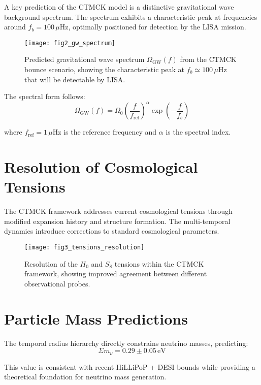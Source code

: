 \documentclass[reprint,amsmath,amssymb,aps,prd,nofootinbib,longbibliography]{revtex4-2}
\begin{document}
A key prediction of the CTMCK model is a distinctive gravitational wave background spectrum. The spectrum exhibits a characteristic peak at frequencies around $f_b = 100\,\mu$Hz, optimally positioned for detection by the LISA mission.

\begin{figure}[htb]
\centering
\texttt{[image: fig2\_gw\_spectrum]}
\caption{Predicted gravitational wave spectrum $\Omega_{\mathrm{GW}}(f)$ from the CTMCK bounce scenario, showing the characteristic peak at $f_b \simeq 100\,\mu$Hz that will be detectable by LISA.}
\label{fig:gw_spectrum}
\end{figure}

The spectral form follows:
\begin{equation}
\Omega_{\mathrm{GW}}(f) = \Omega_0 \left(\frac{f}{f_{\text{ref}}}\right)^{\alpha} \exp\left(-\frac{f}{f_b}\right)
\end{equation}

where $f_{\text{ref}} = 1\,\mu$Hz is the reference frequency and $\alpha$ is the spectral index.

\section{Resolution of Cosmological Tensions}

The CTMCK framework addresses current cosmological tensions through modified expansion history and structure formation. The multi-temporal dynamics introduce corrections to standard cosmological parameters.

\begin{figure}[htb]
\centering
\texttt{[image: fig3\_tensions\_resolution]}
\caption{Resolution of the $H_0$ and $S_8$ tensions within the CTMCK framework, showing improved agreement between different observational probes.}
\label{fig:tensions}
\end{figure}

\section{Particle Mass Predictions}

The temporal radius hierarchy directly constrains neutrino masses, predicting:
\begin{equation}
\Sigma m_\nu = 0.29 \pm 0.05\,\text{eV}
\end{equation}

This value is consistent with recent HiLLiPoP + DESI bounds while providing a theoretical foundation for neutrino mass generation.
\end{document}
